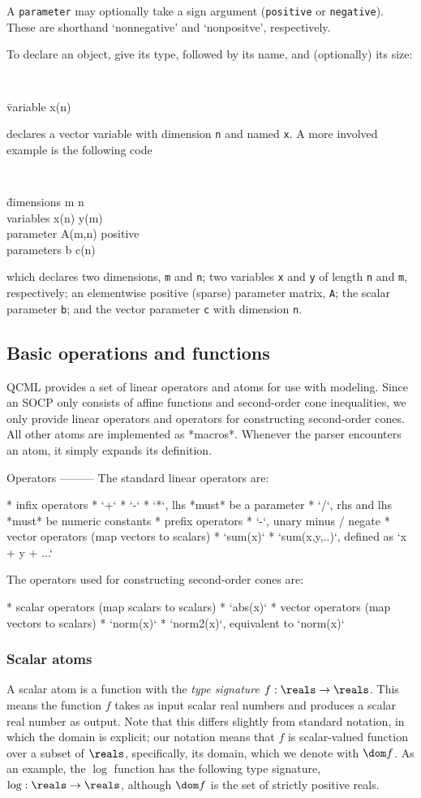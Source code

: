 \documentclass[11pt]{article}
\begin{document}
A {\tt parameter} may optionally take a sign argument ({\tt positive} or 
{\tt negative}). These are shorthand `nonnegative' and `nonpositve', 
respectively.

To declare an object, give its type, followed by its name, and (optionally) 
its size:
{\tt
\begin{tabbing}
  \qquad \= variable x(n)
\end{tabbing}}
\noindent declares a vector variable with dimension {\tt n} and named {\tt x}.
A more involved example is the following code
{\tt
\begin{tabbing}
  \qquad \= dimensions m n \\
  \> variables x(n) y(m) \\
  \> parameter A(m,n) positive \\
  \> parameters b c(n)
\end{tabbing}}
\noindent which declares two dimensions, {\tt m} and {\tt n}; two variables
{\tt x} and {\tt y} of length {\tt n} and {\tt m}, respectively; an
elementwise positive (sparse) parameter matrix, {\tt A}; the scalar parameter
{\tt b}; and the vector parameter {\tt c} with dimension {\tt n}.

\subsection{Basic operations and functions}
QCML provides a set of linear operators and atoms for use with modeling.
Since an SOCP only consists of affine functions and second-order cone
inequalities, we only provide linear operators and operators for constructing
second-order cones. All other atoms are implemented as *macros*. Whenever the
parser encounters an atom, it simply expands its definition.

Operators
---------
The standard linear operators are:

* infix operators
  * `+`
  * `-`
  * `*`, lhs *must* be a parameter
  * `/`, rhs and lhs *must* be numeric constants
* prefix operators
  * `-`, unary minus / negate
* vector operators (map vectors to scalars)
  * `sum(x)`
  * `sum(x,y,..)`, defined as `x + y + ...`

The operators used for constructing second-order cones are:

* scalar operators (map scalars to scalars)
  * `abs(x)`
* vector operators (map vectors to scalars)
  * `norm(x)`
  * `norm2(x)`, equivalent to `norm(x)`
  
  
\subsubsection{Scalar atoms}
A scalar atom is a function with the \emph{type signature} 
$f : \reals \to \reals$. This means the function $f$ takes as input scalar
real numbers and produces a scalar real number as output. Note that this 
differs slightly from standard notation, in which the domain is explicit; 
our notation means that $f$ is
scalar-valued function over a subset of $\reals$, specifically, its domain,
which we denote with $\dom f$. As an example, the $\log$ function has the
following type signature, $\log : \reals \to \reals$, although $\dom f$ is
the set of strictly positive reals.
\end{document}
